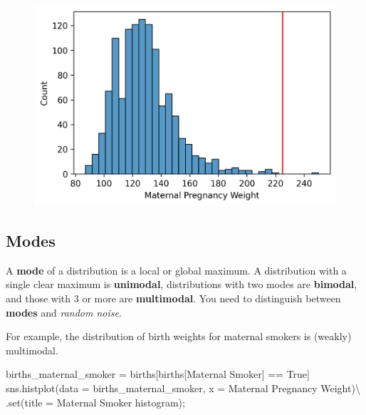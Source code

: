 \documentclass[
  letterpaper,
  DIV=11,
  numbers=noendperiod]{scrreprt}
\newenvironment{Shaded}{\begin{snugshade}}{\end{snugshade}}
\newcommand{\BuiltInTok}[1]{\textcolor[rgb]{0.00,0.23,0.31}{#1}}
\newcommand{\NormalTok}[1]{\textcolor[rgb]{0.00,0.23,0.31}{#1}}
\newcommand{\OperatorTok}[1]{\textcolor[rgb]{0.37,0.37,0.37}{#1}}
\newcommand{\StringTok}[1]{\textcolor[rgb]{0.13,0.47,0.30}{#1}}
\newcommand{\VariableTok}[1]{\textcolor[rgb]{0.07,0.07,0.07}{#1}}
\begin{document}
\begin{figure}[H]

{\centering \includegraphics{visualization_1/visualization_1_files/figure-pdf/cell-12-output-1.png}

}

\end{figure}

\hypertarget{modes}{%
\subsection{Modes}\label{modes}}

A \textbf{mode} of a distribution is a local or global maximum. A
distribution with a single clear maximum is \textbf{unimodal},
distributions with two modes are \textbf{bimodal}, and those with 3 or
more are \textbf{multimodal}. You need to distinguish between
\textbf{modes} and \emph{random noise}.

For example, the distribution of birth weights for maternal smokers is
(weakly) multimodal.

\begin{Shaded}
\begin{Highlighting}[]
\NormalTok{births\_maternal\_smoker }\OperatorTok{=}\NormalTok{ births[births[}\StringTok{\textquotesingle{}Maternal Smoker\textquotesingle{}}\NormalTok{] }\OperatorTok{==} \VariableTok{True}\NormalTok{]}
\NormalTok{sns.histplot(data }\OperatorTok{=}\NormalTok{ births\_maternal\_smoker, x }\OperatorTok{=} \StringTok{\textquotesingle{}Maternal Pregnancy Weight\textquotesingle{}}\NormalTok{)}\OperatorTok{\textbackslash{}}
\NormalTok{            .}\BuiltInTok{set}\NormalTok{(title }\OperatorTok{=} \StringTok{\textquotesingle{}Maternal Smoker histogram\textquotesingle{}}\NormalTok{)}\OperatorTok{;}
\end{Highlighting}
\end{Shaded}
\end{document}
